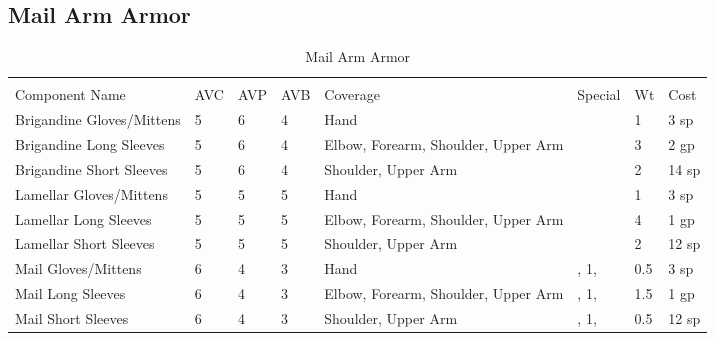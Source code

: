 \documentclass[oneside,11pt,english]{book}
\begin{document}
\subsection{Mail Arm Armor}
\begin{longtabu} to 
	\captionsetup{textformat=empty, labelformat=blank}
	\caption{Mail Arm Armor} \vspace{-15pt}
	\label{tab:Mail Arm Armor}\\
Component Name&AVC&AVP&AVB& Coverage& Special& Wt&Cost\\\toprule
Brigandine Gloves/Mittens& 5& 6& 4& Hand& & 1& 3 sp\\
Brigandine Long Sleeves& 5& 6& 4& Elbow, Forearm, Shoulder, Upper Arm& & 3& 2 gp\\
Brigandine Short Sleeves& 5& 6& 4& Shoulder, Upper Arm& & 2& 14 sp\\
Lamellar Gloves/Mittens& 5& 5& 5& Hand& & 1& 3 sp\\
Lamellar Long Sleeves& 5& 5& 5& Elbow, Forearm, Shoulder, Upper Arm& & 4& 1 gp\\
Lamellar Short Sleeves& 5& 5& 5& Shoulder, Upper Arm& & 2& 12 sp\\
Mail Gloves/Mittens& 6& 4& 3& Hand& ,  1, & 0.5& 3 sp\\
Mail Long Sleeves& 6& 4& 3& Elbow, Forearm, Shoulder, Upper Arm& ,  1, & 1.5& 1 gp\\
Mail Short Sleeves& 6& 4& 3& Shoulder, Upper Arm& ,  1, & 0.5& 12 sp\\
\end{longtabu}
\end{document}
